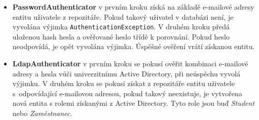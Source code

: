 \begin{itemize}
	\item \textbf{PasswordAuthenticator} v prvním kroku získá na základě e-mailové adresy entitu uživatele z repozitáře. Pokud takový uživatel v databázi není, je vyvolána výjimka \texttt{AuthenticationException}. V druhém kroku předá uloženou hash hesla a ověřované heslo třídě  k porovnání. Pokud heslo neodpovídá, je opět vyvolána výjimka. Úspěšné ověření vrátí získanou entitu.
	\item \textbf{LdapAuthenticator} v prvním kroku se pokusí ověřit kombinaci e-mailové adresy a hesla vůči univerzitnímu Active Directory, při neúspěchu vyvolá výjimku. V druhém kroku se pokusí získat z repozitáře entitu uživatele s~odpovídající e-mailovou adresou, pokud takový neexistuje, je vytvořena nová entita s rolemi získanými z Active Directory. Tyto role jsou buď \textit{Student} nebo \textit{Zaměstnanec}.
\end{itemize}

